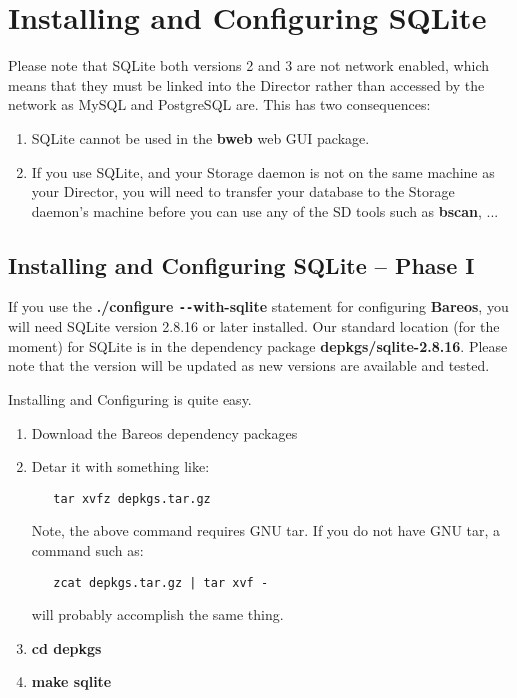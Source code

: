 
\chapter{Installing and Configuring SQLite}
\label{SqlLiteChapter}

Please note that SQLite both versions 2 and 3 are not network enabled,
which means that they must be linked into the Director rather than accessed
by the network as MySQL and PostgreSQL are. This has two consequences:
\begin{enumerate}
\item SQLite cannot be used in the {\bf bweb} web GUI package.
\item If you use SQLite, and your Storage daemon is not on the same
machine as your Director, you will need to transfer your database
to the Storage daemon's machine before you can use any of the SD tools
such as {\bf bscan}, ...
\end{enumerate}

\section{Installing and Configuring SQLite -- Phase I}

If you use the {\bf ./configure \verb:--:with-sqlite} statement for configuring {\bf
Bareos}, you will need SQLite version 2.8.16 or later installed. Our standard
location (for the moment) for SQLite is in the dependency package {\bf
depkgs/sqlite-2.8.16}. Please note that the version will be updated as new
versions are available and tested.

Installing and Configuring is quite easy.

\begin{enumerate}
\item Download the Bareos dependency packages
\item Detar it with something like:

\begin{verbatim}
   tar xvfz depkgs.tar.gz
\end{verbatim}

   Note, the above command requires GNU tar. If you do not  have GNU tar, a
   command such as:

\begin{verbatim}
   zcat depkgs.tar.gz | tar xvf -
\end{verbatim}

   will probably accomplish the same thing.

\item {\bf cd depkgs}

\item {\bf make sqlite}

\end{enumerate}


